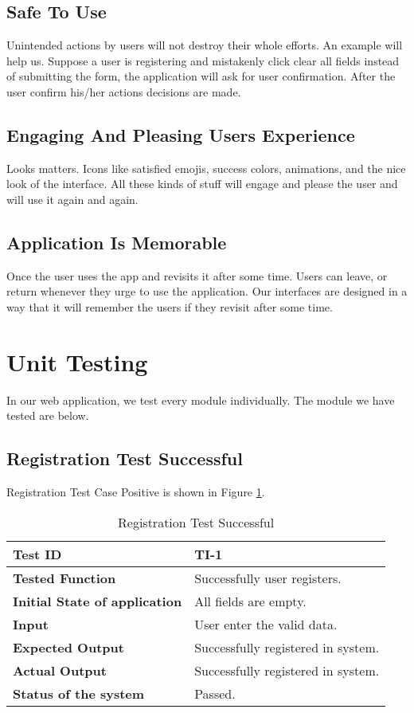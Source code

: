 \subsection{Safe To Use}
Unintended actions by users will not destroy their whole efforts. An example will help us. Suppose a user is registering and mistakenly click clear all fields instead of submitting the form, the application will ask for user confirmation. After the user confirm his/her actions decisions are made. 
\subsection{Engaging And Pleasing Users Experience}
Looks matters. Icons like satisfied emojis, success colors, animations, and the nice look of the interface. All these kinds of stuff will engage and please the user and will use it again and again.
\subsection{Application Is Memorable}
Once the user uses the app and revisits it after some time. Users can leave, or return whenever they urge to use the application. Our interfaces are designed in a way that it will remember the users if they revisit after some time.
\newpage
\section{Unit Testing}
\doublespacing
In our web application, we test every module individually. The module we have tested are below.
\subsection{Registration Test Successful}
Registration Test Case Positive is shown in Figure \ref{tt1}.
\begin{table}[!h]
    \centering
    \begin{tabular}{|p{5cm}|p{8cm}|}
        \hline
        \textbf{Test ID} & \textbf{TI-1}\\
        \hline
        \textbf{Tested Function} &  Successfully user registers. \\
        \hline
        \textbf{Initial State of application} & All fields are empty.\\
        \hline
        \textbf{Input} & User enter the valid data.\\
        \hline
        \textbf{Expected Output} &  Successfully registered in system.\\
        \hline
        \textbf{Actual Output} & Successfully registered in system.\\
         \hline
         \textbf{Status of the system} & Passed.\\
         \hline
    \end{tabular}
    \caption{Registration Test Successful }
    \label{tt1}
\end{table}
